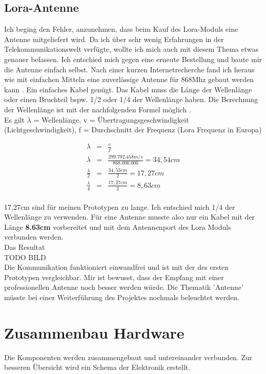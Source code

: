 \documentclass[11pt,english,german]{report}
\theoremstyle{definition}
\begin{document}
\subsection{Lora-Antenne}
Ich beging den Fehler, anzunehmen, dass beim Kauf des Lora-Moduls eine Antenne mitgeliefert wird. Da ich über sehr wenig Erfahrungen in der Telekommunikationswelt verfügte, wollte ich mich auch mit diesem Thema etwas genauer befassen. Ich entschied mich gegen eine erneute Bestellung und baute mir die Antenne einfach selbst. Nach einer kurzen Internetrecherche fand ich heraus wie mit einfachen Mitteln eine zuverlässige Antenne für 868Mhz gebaut werden kann \cite{wavelengthTTN}. Ein einfaches Kabel genügt. Das Kabel muss die Länge der Wellenlänge oder einen Bruchteil bspw. 1/2 oder 1/4 der Wellenlänge haben. Die Berechnung der Wellenlänge ist mit der nachfolgenden Formel möglich \cite{wavelength}.\\[0.3cm]
Es gilt $\lambda$ = Wellenlänge, v = Übertragungsgeschwindigkeit (Lichtgeschwindigkeit), f = Durchschnitt der Frequenz (Lora Frequenz in Europa)
\begin{center}
	\begin{eqnarray*}
		\lambda &=& \frac{v}{f}\\
		\lambda &=& \frac{299.792.458 m/s}{868.000.000} = 34,54cm\\
		\frac{\lambda}{2} &=& \frac{34,53cm}{2} = 17,27cm\\
		\frac{\lambda}{4} &=& \frac{17,27cm}{2} = 8,63cm \\
	\end{eqnarray*}
\end{center}
17,27cm sind für meinen Prototypen zu lange. Ich entschied mich 1/4 der Wellenlänge zu verwenden. Für eine Antenne musste also nur ein Kabel mit der Länge \textbf{8.63cm} vorbereitet und mit dem Antennenport des Lora Moduls verbunden werden.\\[0.3cm]
Das Resultat\\
TODO BILD\\[0.3cm]
Die Kommunikation funktioniert einwandfrei und ist mit der des ersten Prototypen vergleichbar. Mir ist bewusst, dass der Empfang mit einer professionellen Antenne noch besser werden würde. Die Thematik 'Antenne' müsste bei einer Weiterführung des Projektes nochmals beleuchtet werden.
\newpage
\section{Zusammenbau Hardware}
Die Komponenten werden zusammengebaut und untereinander verbunden. Zur besseren Übersicht wird ein Schema  der Elektronik erstellt.
\end{document}
